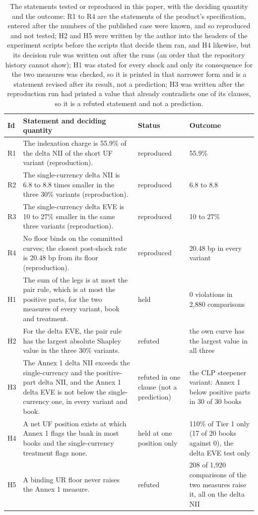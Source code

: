 \begin{table}[htbp]
\centering
\footnotesize
\setlength{\tabcolsep}{3.5pt}
\caption{The statements tested or reproduced in this paper, with the deciding quantity and the outcome: R1 to R4 are the statements of the product's specification, entered after the numbers of the published case were known, and so reproduced and not tested; H2 and H5 were written by the author into the headers of the experiment scripts before the scripts that decide them ran, and H4 likewise, but its decision rule was written out after the runs (an order that the repository history cannot show); H1 was stated for every shock and only its consequence for the two measures was checked, so it is printed in that narrower form and is a statement revised after its result, not a prediction; H3 was written after the reproduction run had printed a value that already contradicts one of its clauses, so it is a refuted statement and not a prediction.}
\label{tab:hypotheses}
\begin{tabular}{p{0.8cm}p{7.6cm}p{1.9cm}p{3.6cm}}
\toprule
Id & Statement and deciding quantity & Status & Outcome \\
\midrule
R1 & The indexation charge is 55.9\% of the delta NII of the short UF variant (reproduction). & reproduced & 55.9\% \\
R2 & The single-currency delta NII is 6.8 to 8.8 times smaller in the three 30\% variants (reproduction). & reproduced & 6.8 to 8.8 \\
R3 & The single-currency delta EVE is 10 to 27\% smaller in the same three variants (reproduction). & reproduced & 10 to 27\% \\
R4 & No floor binds on the committed curves; the closest post-shock rate is 20.48 bp from its floor (reproduction). & reproduced & 20.48 bp in every variant \\
H1 & The sum of the legs is at most the pair rule, which is at most the positive parts, for the two measures of every variant, book and treatment. & held & 0 violations in 2{,}880 comparisons \\
H2 & For the delta EVE, the pair rule has the largest absolute Shapley value in the three 30\% variants. & refuted & the own curve has the largest value in all three \\
H3 & The Annex 1 delta NII exceeds the single-currency and the positive-part delta NII, and the Annex 1 delta EVE is not below the single-currency one, in every variant and book. & refuted in one clause (not a prediction) & the CLP steepener variant: Annex 1 below positive parts in 30 of 30 books \\
H4 & A net UF position exists at which Annex 1 flags the bank in most books and the single-currency treatment flags none. & held at one position only & 110\% of Tier 1 only (17 of 20 books against 0), the delta EVE test only \\
H5 & A binding UR floor never raises the Annex 1 measure. & refuted & 208 of 1{,}920 comparisons of the two measures raise it, all on the delta NII \\
\bottomrule
\end{tabular}
\end{table}
